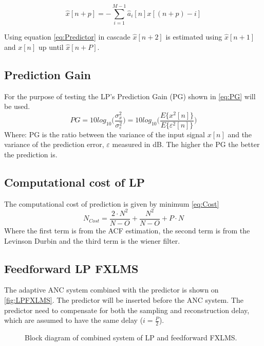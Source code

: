 \begin{equation}\label{eq:Predictor}
\hat{x}[n+p] =- \sum^{M-1}_{i=1}\hat{a}_i[n]x[(n+p)-i]
\end{equation}

Using equation \ref{eq:Predictor} in cascade $\hat{x}[n+2]$ is estimated using $\hat{x}[n+1]$ and $x[n]$ up until $\hat{x}[n+P]$. 


\subsection{Prediction Gain}
For the purpose of testing the LP's Prediction Gain (PG) shown in \autoref{eq:PG} will be used. 
\begin{equation}\label{eq:PG}
PG = 10 log_{10}\bigg(\frac{\sigma^2_x}{\sigma^2_\varepsilon}\bigg) = 10 log_{10}\bigg(\frac{E\{x^2[n]\}}{E\{\varepsilon^2[n]\}}\bigg)
\end{equation}
Where: PG is the ratio between the variance of the input signal $x[n]$ and the variance of the prediction error, $\varepsilon$ measured in dB. The higher the PG the better the prediction is.

\subsection{Computational cost of LP}
The computational cost of prediction is given by minimum \autoref{eq:Cost}
\begin{equation}\label{eq:Cost}
N_{Cost} = \frac{2\cdot N^2}{N-O}+\frac{N^2}{N-O}+P\cdot N   
\end{equation}
Where the first term is from the ACF estimation, the second term is from the Levinson Durbin and the third term is the wiener filter. 

\subsection{Feedforward LP FXLMS}
The adaptive ANC system combined with the predictor is shown on \autoref{fig:LPFXLMS}. The predictor will be inserted before the ANC system. The predictor need to compensate for both the sampling and reconstruction delay, which are assumed to have the same delay ($i=\frac{P}{2}$).   

\begin{figure}[H]
	\centering
	
	\caption{Block diagram of combined system of LP and feedforward FXLMS.}
	\label{fig:LPFXLMS}
\end{figure}

